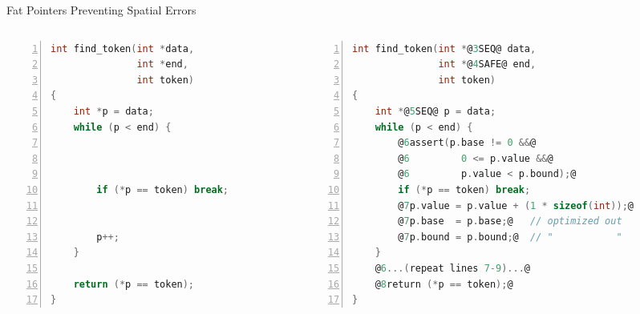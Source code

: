 \documentclass[aspectratio=169]{beamer}
\begin{document}
\begin{frame}[fragile]{Fat Pointers Preventing Spatial Errors}
    \begin{columns}[T]
      \begin{column}{0.44\textwidth}
\begin{lstlisting}[language=C,numbers=left,mathescape,basicstyle={\scriptsize\ttfamily}]
int find_token(int *data,
               int *end,
               int token)
{
    int *p = data;
    while (p < end) {



        if (*p == token) break;


        p++;
    }

    return (*p == token);
}
\end{lstlisting}
\end{column}

\pause

\begin{column}{0.56\textwidth}

\begin{lstlisting}[language=C,numbers=left,mathescape,basicstyle={\scriptsize\ttfamily},
    moredelim={**[is][\btHL<3>]{@3}{@}},
    moredelim={**[is][{\btHL<4>}]{@4}{@}},
    moredelim={**[is][{\btHL<5>}]{@5}{@}},
    moredelim={**[is][{\btHL<6>}]{@6}{@}},
    moredelim={**[is][{\btHL<7>}]{@7}{@}},
    moredelim={**[is][{\btHL<8>}]{@8}{@}}
]
int find_token(int *@3SEQ@ data,
               int *@4SAFE@ end,
               int token)
{
    int *@5SEQ@ p = data;
    while (p < end) {
        @6assert(p.base != 0 &&@
        @6         0 <= p.value &&@
        @6         p.value < p.bound);@
        if (*p == token) break;
        @7p.value = p.value + (1 * sizeof(int));@
        @7p.base  = p.base;@   // optimized out
        @7p.bound = p.bound;@  // "           "
    }
    @6...(repeat lines 7-9)...@
    @8return (*p == token);@
}
\end{lstlisting}
\end{column}

\end{columns}
\end{frame}
\end{document}
